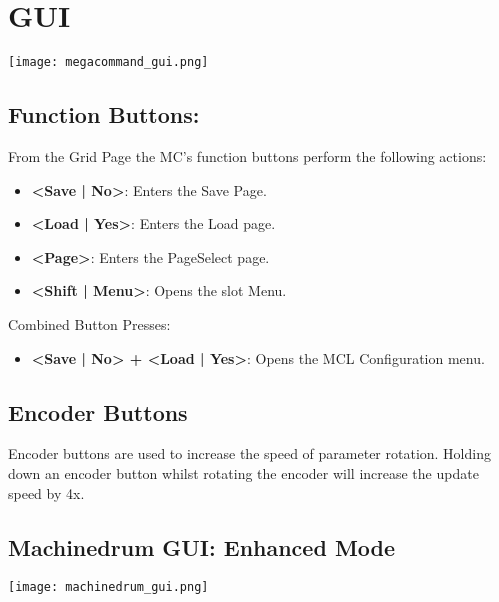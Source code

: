 \chapter{GUI}
\begin{center}
   \texttt{[image: megacommand\_gui.png]}
\end{center}
\section{Function Buttons:}
From the Grid Page the MC's function buttons perform the following actions:
\begin{itemize}
\item{\textbf{<Save | No>}: Enters the Save Page.}
\item{\textbf{<Load | Yes>}: Enters the Load page.}
\item{\textbf{<Page>}: Enters the PageSelect page.}
\item{\textbf{<Shift | Menu>}: Opens the slot Menu. }
\end{itemize}
Combined Button Presses:
\begin{itemize}
\item{\textbf{<Save | No> + <Load | Yes>}: Opens the MCL Configuration menu. }
\end{itemize}

\section{Encoder Buttons}
Encoder buttons are used to increase the speed of parameter rotation.
Holding down an encoder button whilst rotating the encoder will increase the update speed by 4x.

\newpage
\section{Machinedrum GUI: Enhanced Mode}
\texttt{[image: machinedrum\_gui.png]}

